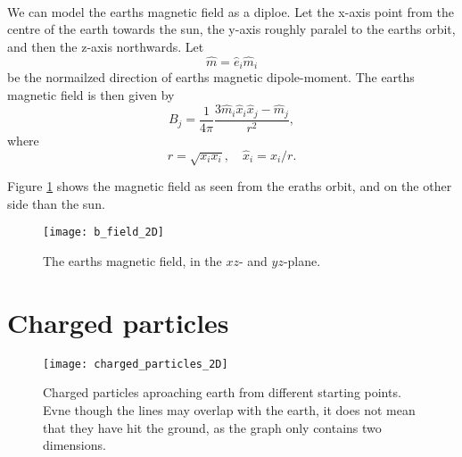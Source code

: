 \documentclass{article}
\begin{document}
    \paragraph{}
    We can model the earths magnetic field as a diploe. Let the x-axis point from the centre of the earth towards the sun, the y-axis roughly paralel to the earths orbit, and then the z-axis northwards. Let
        \begin{equation*}
            \hat m = \hat e_i \hat m_i
        \end{equation*}
        be the normailzed direction of earths magnetic dipole-moment. The earths magnetic field is then given by
        \begin{equation}
            B_j = \frac{1}{4\pi} \frac{3\hat m_i \hat x_i \hat x_j - \hat m_j}{r^2},
        \end{equation}
        where
        \begin{equation*}
            r = \sqrt{x_ix_i}, \quad \hat x_i = x_i / r.
        \end{equation*}

        Figure \ref{B-field} shows the magnetic field as seen from the eraths orbit, and on the other side than the sun. 
        
        \begin{figure}
            \centering    
            \texttt{[image: b\_field\_2D]}
            \caption{The earths magnetic field, in the $xz$- and $yz$-plane.  }
            \label{B-field}
        \end{figure}

    \section*{Charged particles}
    \begin{figure}
        \centering
        \vspace{-50px}
        \texttt{[image: charged\_particles\_2D]}
        \caption{Charged particles aproaching earth from different starting points. Evne though the lines may overlap with the earth, it does not mean that they have hit the ground, as the graph only contains two dimensions.}
        \label{Charged particles}
    \end{figure}
\end{document}
